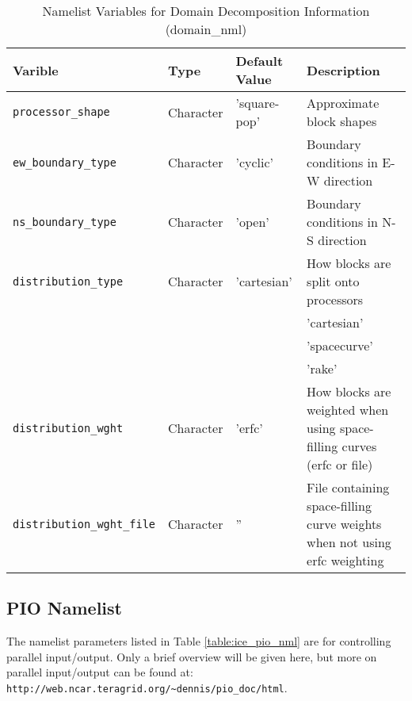 \begin{table}
  \begin{center}
  \caption{Namelist Variables for Domain Decomposition Information (domain_nml)}
  \label{table:domain_nml}
  \begin{tabular}{p{4.0cm}p{2cm}p{2cm}p{6.0cm}} \hline
  Varible & Type & Default Value & Description               \\
\hline \hline

{\tt processor\_shape} & Character & 'square-pop' & Approximate block shapes \\

{\tt ew\_boundary\_type} & Character & 'cyclic' & Boundary conditions in E-W direction\\

{\tt ns\_boundary\_type} & Character & 'open' & Boundary conditions in N-S direction\\

{\tt distribution\_type} & Character & 'cartesian' & How blocks are split onto processors \\
 & & & 'cartesian' \\
 & & & 'spacecurve' \\
 & & & 'rake' \\

{\tt distribution\_wght} & Character & 'erfc' & How blocks are weighted when using space-filling curves (erfc or file) \\

{\tt distribution\_wght\_file} & Character & '' & File containing space-filling curve weights when not using erfc weighting \\

  \hline
  \end{tabular}
  \end{center}
\end{table}

\subsection{PIO Namelist}

The namelist parameters listed in Table \ref{table:ice_pio_nml} are for
controlling parallel input/output.  Only a brief overview will be
given here, but more on parallel input/output can be found at:\\

  {\tt http://web.ncar.teragrid.org/\~{}dennis/pio\_doc/html}.\\

